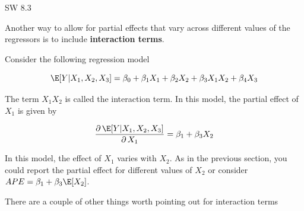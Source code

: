 \documentclass[
  letterpaper,
  DIV=11,
  numbers=noendperiod]{scrreprt}
\begin{document}
SW 8.3

Another way to allow for partial effects that vary across different
values of the regressors is to include \textbf{interaction terms}.

Consider the following regression model

\[
  \E[Y|X_1,X_2,X_3] = \beta_0 + \beta_1 X_1 + \beta_2 X_2 + \beta_3 X_1 X_2 + \beta_4 X_3
\]

The term \(X_1 X_2\) is called the interaction term. In this model, the
partial effect of \(X_1\) is given by

\[
  \frac{\partial \, \E[Y|X_1,X_2,X_3]}{\partial \, X_1} = \beta_1 + \beta_3 X_2
\]

In this model, the effect of \(X_1\) varies with \(X_2\). As in the
previous section, you could report the partial effect for different
values of \(X_2\) or consider \(APE = \beta_1 + \beta_3 \E[X_2]\).

There are a couple of other things worth pointing out for interaction
terms
\end{document}
